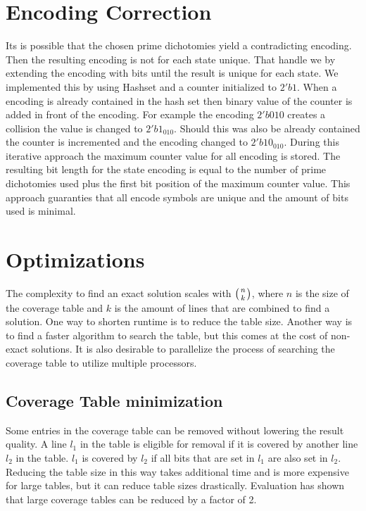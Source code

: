 \section{Encoding Correction}

Its is possible that the chosen prime dichotomies yield a contradicting encoding. Then the resulting encoding is not for each state unique. That handle we by extending the encoding with bits until the result is unique for each state. We implemented this by using Hashset and a counter initialized to $2'b1$. When a encoding is already contained in the hash set then binary value of the counter is added in front of the encoding. For example the encoding $2'b010$ creates a collision the value is changed to $2'b1_010$. Should this was also be already contained the counter is incremented and the encoding changed to $2'b10_010$. During this iterative approach the maximum counter value for all encoding is stored. The resulting bit length for the state encoding is equal to the number of prime dichotomies used plus the first bit position of the maximum counter value. This approach guaranties that all encode symbols are unique and the amount of bits used is minimal.

\section{Optimizations}

The complexity to find an exact solution scales with $\left( n\atop k \right)$, where $n$ is the size of the coverage table and $k$ is the amount of lines that are combined to find a solution. One way to shorten runtime is to reduce the table size. Another way is to find a faster algorithm to search the table, but this comes at the cost of non-exact solutions. It is also desirable to parallelize the process of searching the coverage table to utilize multiple processors.

\subsection{Coverage Table minimization}

Some entries in the coverage table can be removed without lowering the result quality. A line $l_1$ in the table is eligible for removal if it is covered by another line $l_2$ in the table. $l_1$ is covered by $l_2$ if all bits that are set in $l_1$ are also set in $l_2$. Reducing the table size in this way takes additional time and is more expensive for large tables, but it can reduce table sizes drastically. Evaluation has shown that large coverage tables can be reduced by a factor of 2.

